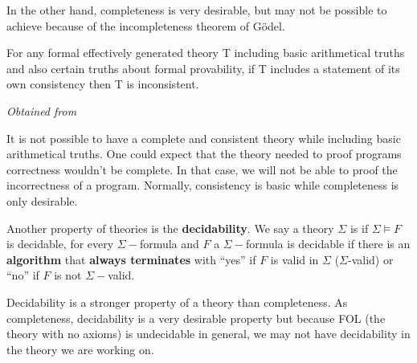 In the other hand, completeness is very desirable, but may not be possible to achieve because of the incompleteness theorem of Gödel.


\begin{itheorem}


For any formal effectively generated theory T including basic arithmetical truths and also certain truths about formal provability, if T includes a statement of its own consistency then T is inconsistent.


\textit{Obtained from }
\end{itheorem}




It is not possible to have a complete and consistent theory while including basic arithmetical truths. 
%
One could expect that the theory needed to proof programs correctness wouldn't be complete. 
%
In that case, we will not be able to proof the incorrectness of a program.
%
Normally, consistency is basic while completeness is only desirable.

Another property of theories is the \textbf{decidability}. We say a theory $\Sigma$ is  if $\Sigma \vDash F$ is decidable, for every $\Sigma-$formula 
and 
$F$ a $\Sigma-$formula is decidable if there is an \textbf{algorithm} that \textbf{always terminates} with ``yes'' if $F$ is valid in $\Sigma$ ($\Sigma$-valid) or ``no'' if $F$ is not $\Sigma-$valid.


Decidability is a stronger property of a theory than completeness. 
%
As completeness, decidability is a very desirable property but because \gls{FOL} (the theory with no axioms) is undecidable in general, we may not have decidability in the theory we are working on.



